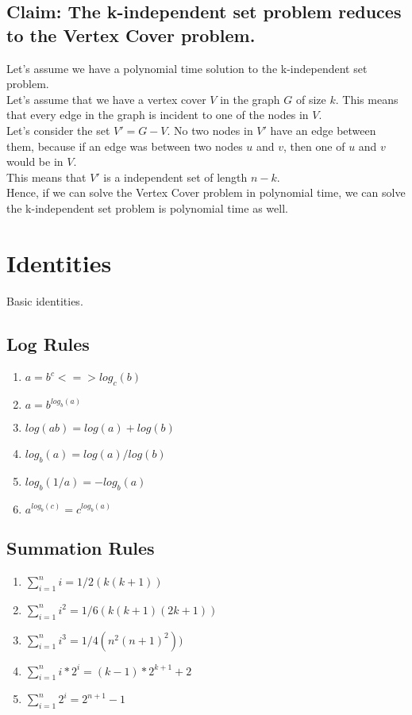 \documentclass[9pt,twocolumn]{article}
\begin{document}
\subsection{Claim: The k-independent set problem reduces to the Vertex Cover problem.}
Let's assume we have a polynomial time solution to the k-independent set problem.\\
Let's assume that we have a vertex cover $V$ in the graph $G$ of size $k$. This means that every edge in the graph is incident to one of the nodes in $V$. \\
Let's consider the set $V' = G - V$. No two nodes in $V'$ have an edge between them, because if an edge was between two nodes $u$ and $v$, then one of $u$ and $v$ would be in $V$.\\
This means that $V'$ is a independent set of length $n-k$.\\
Hence, if we can solve the Vertex Cover problem in polynomial time, we can solve the k-independent set problem is polynomial time as well.

\section{ Identities }
Basic identities.
\subsection{ Log Rules }
\begin{enumerate}
    \item $a = b^c <=> log_c(b)$
    \item $a = b^{log_b(a)}$
    \item $log(a b) = log(a) + log(b)$
    \item $log_b(a) = log(a)/log(b)$
    \item $log_b(1/a) = -log_b(a)$
    \item $a^{log_b(c)} = c^{log_b(a)}$
    \end{enumerate}
\subsection{ Summation Rules}
\begin{enumerate}
    \item $\sum_{i = 1}^n i = 1/2(k(k+1))$
    \item $\sum_{i = 1}^n i^2 = 1/6(k(k+1)(2k+1))$
    \item $\sum_{i = 1}^n i^3 = 1/4(n^2 (n+1)^2))$
    \item $\sum_{i = 1}^n i * 2^i = (k-1) * 2^{k+1} + 2$
    \item $\sum_{i = 1}^n 2^i = 2^{n+1}-1$
\end{enumerate}
\end{document}
